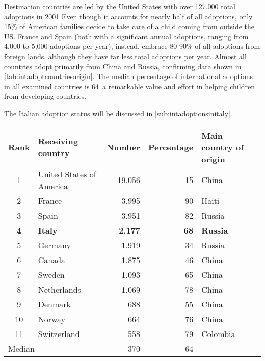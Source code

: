 Destination countries are led by the United States with over 127.000 total adoptions in 2001 Even though it accounts for nearly half of all adoptions, only 15\% of American families decide to take care of a child coming from outside the US. France and Spain (both with a significant annual adoptions, ranging from 4,000 to 5,000 adoptions per year), instead, embrace 80-90\% of all adoptions from foreign lands, although they have far less total adoptions per year. Almost all countries adopt primarily from China and Russia, confirming data shown in \ref{tab:intadoptcountriesorigin}. The median percentage of international adoptions in all examined countries is 64\, a remarkable value and effort in helping children from developing countries.

The Italian adoption status will be discussed in \ref{sub:intadoptionsinitaly}.

\begin{table}[H]
   \centering
   \begin{tabular}{c l r r l}
      Rank & Receiving country\footnotemark[1] & Number & Percentage & Main country of origin\\
      \hline
      1 & United States of America & 19.056 & 15 & China\\
      2 & France & 3.995 & 90 & Haiti\\
      3 & Spain & 3.951 & 82 & Russia\\
      \textcolor{BrickRed}{\textbf{4}} & \textcolor{BrickRed}{\textbf{Italy}} & \textcolor{BrickRed}{\textbf{2.177}} & \textcolor{BrickRed}{\textbf{68}} & \textcolor{BrickRed}{\textbf{Russia}}\\
      5 & Germany & 1.919 & 34 & Russia\\
      6 & Canada & 1.875 & 46 & China\\
      7 & Sweden & 1.093 & 65 & China\\
      8 & Netherlands & 1.069 & 78 & China\\
      9 & Denmark & 688 & 55 & China\\
      10 & Norway & 664 & 76 & China\\
      11 & Switzerland & 558 & 79 & Colombia\\
      \hline
      \multicolumn{2}{l}{Median} & 370 & 64 &\\
   \end{tabular}
    \label{tab:intadoptcountriesdestination}
\end{table}

